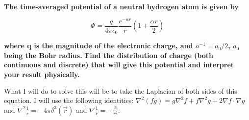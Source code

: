 \begin{homeworkProblem}

\textbf{The time-averaged potential of a neutral hydrogen atom is given by }

\begin{equation}
\Phi = \frac{q}{4\pi\epsilon_0}\frac{e^{-\alpha r}}{r}(1+\frac{\alpha r}{2})
\end{equation}
 
\textbf{where q is the magnitude of the electronic charge, and $a^{-1} = a_0/2$, $a_0$ being the 
Bohr radius. Find the distribution of charge (both continuous and discrete) that will 
give this potential and interpret your result physically. }
\\ \par
What I will do to solve this will be to take the Laplacian of both sides of this equation. I will use the following identities: $\nabla^2 (f g) = g \nabla^2 f + f \nabla^2 g + 2 \nabla f \cdot \nabla g $ and $\nabla^2 \frac{1}{r} = -4\pi \delta^3(\vec{r})$ and $\nabla \frac{1}{r} = -\frac{\hat{r}}{r^2}$.


\end{homeworkProblem}
